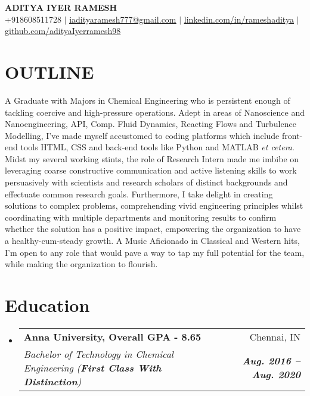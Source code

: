 \documentclass[letterpaper,11pt]{article}
\makeatletter
\newcommand{\resumeSubheading}[4]{
  \vspace{-2pt}\item
    \begin{tabular*}{0.97\textwidth}[t]{l@{\extracolsep{\fill}}r}
      \textbf{#1} & #2 \\
      \textit{\small#3} & \textit{\small #4} \\
    \end{tabular*}\vspace{-7pt}
}
\newcommand{\resumeSubHeadingListStart}{\begin{itemize}[leftmargin=0.15in, label={}]}
\newcommand{\resumeSubHeadingListEnd}{\end{itemize}}
\makeatother
\begin{document}

\begin{center}
    \textbf{\Huge \scshape ADITYA IYER RAMESH} \\ \vspace{1pt}
    \small +918608511728 $|$
    \href{mailto:iadityaramesh777@gmail.com}{\underline{iadityaramesh777@gmail.com}} $|$
    \href{https://linkedin.com/in/...}{\underline{linkedin.com/in/rameshaditya}} $|$
    \href{https://github.com/adityaIyerramesh98}{\underline{github.com/adityaIyerramesh98}}
\end{center}

\section{\textbf{OUTLINE}}
\justifying
\noindent
A Graduate with Majors in Chemical Engineering who is persistent enough of tackling coercive and high-pressure operations. Adept in areas of Nanoscience and Nanoengineering, API, Comp. Fluid Dynamics, Reacting Flows and Turbulence Modelling, I've made myself accustomed to coding platforms which include front-end tools HTML, CSS and back-end tools like Python and MATLAB \textit{et cetera}. Midst my several working stints, the role of Research Intern made me imbibe on leveraging coarse constructive communication and active listening skills to work persuasively with scientists and research scholars of distinct backgrounds and effectuate common research goals. Furthermore, I take delight in creating solutions to complex problems, comprehending vivid engineering principles whilst coordinating with multiple departments and monitoring results to confirm whether the solution has a positive impact, empowering the organization to have a healthy-cum-steady growth. A Music Aficionado in Classical and Western hits, I'm open to any role that would pave a way to tap my full potential for the team, while making the organization to flourish.


\section{Education}
  \resumeSubHeadingListStart
    \resumeSubheading
      {Anna University, \textbf{Overall GPA - 8.65}}{Chennai, IN}
      {Bachelor of Technology in Chemical Engineering (\textbf{First Class With Distinction})}{\textbf{Aug. 2016 -- Aug. 2020}}
  \resumeSubHeadingListEnd
\end{document}

